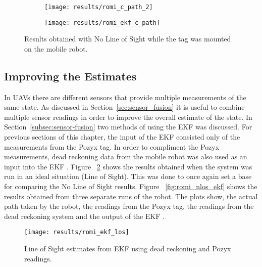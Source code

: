 \begin{figure}[ht!]
    \centering
    \begin{subfigure}{0.7\textwidth}
            \texttt{[image: results/romi\_c\_path\_2]}
    \end{subfigure}
    \begin{subfigure}{0.7\textwidth}
            \texttt{[image: results/romi\_ekf\_c\_path]}
    \end{subfigure}
    \caption{Results obtained with No Line of Sight while the tag was mounted on the mobile robot.}
    \label{fig:romi_nlos_1}
\end{figure}

\subsection{Improving the Estimates}\label{sec:improving-the-estimates}
In UAVs there are different sensors that provide multiple measurements of the same state.
As discussed in Section~\ref{sec:sensor_fusion} it is useful to combine multiple sensor readings in order to improve the overall estimate of the state.
In Section~\ref{subsec:sensor-fusion} two methods of using the EKF was discussed.
For previous sections of this chapter, the input of the EKF consisted only of the measurements from the Pozyx tag.
In order to compliment the Pozyx measurements, dead reckoning data from the mobile robot was also used as an input into the EKF .
Figure ~\ref{fig:romi_los} shows the results obtained when the system was run in an ideal situation (Line of Sight).
This was done to once again set a base for comparing the No Line of Sight results.
Figure ~\ref{fig:romi_nlos_ekf} shows the results obtained from three separate runs of the robot.
The plots show, the actual path taken by the robot, the readings from the Pozyx tag, the readings from the dead reckoning system and the output of the EKF .
\begin{figure}[ht!]
    \centering
    \texttt{[image: results/romi\_ekf\_los]}
    \caption{Line of Sight estimates from EKF using dead reckoning and Pozyx readings.}
    \label{fig:romi_los}
\end{figure}

